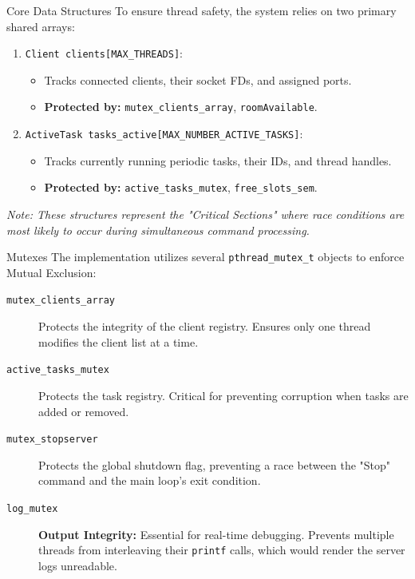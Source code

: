 \begin{frame}{Core Data Structures}
    To ensure thread safety, the system relies on two primary shared arrays:
    \begin{enumerate}
        \item \texttt{Client clients[MAX\_THREADS]}:
        \begin{itemize}
            \item Tracks connected clients, their socket FDs, and assigned ports.
            \item \textbf{Protected by:} \texttt{mutex\_clients\_array}, \texttt{roomAvailable}.
        \end{itemize}
        \item \texttt{ActiveTask tasks\_active[MAX\_NUMBER\_ACTIVE\_TASKS]}:
        \begin{itemize}
            \item Tracks currently running periodic tasks, their IDs, and thread handles.
            \item \textbf{Protected by:} \texttt{active\_tasks\_mutex}, \texttt{free\_slots\_sem}.
        \end{itemize}
    \end{enumerate}
    \vspace{0.3cm}
    \textit{Note: These structures represent the "Critical Sections" where race conditions are most likely to occur during simultaneous command processing.}
\end{frame}

\begin{frame}{Mutexes}
    The implementation utilizes several \texttt{pthread\_mutex\_t} objects to enforce Mutual Exclusion:
    \begin{description}
        \item[\texttt{mutex\_clients\_array}] Protects the integrity of the client registry. Ensures only one thread modifies the client list at a time.
        \item[\texttt{active\_tasks\_mutex}] Protects the task registry. Critical for preventing corruption when tasks are added or removed.
        \item[\texttt{mutex\_stopserver}] Protects the global shutdown flag, preventing a race between the "Stop" command and the main loop's exit condition.
        \item[\texttt{log\_mutex}] \textbf{Output Integrity:} Essential for real-time debugging. Prevents multiple threads from interleaving their \texttt{printf} calls, which would render the server logs unreadable.
    \end{description}
\end{frame}

